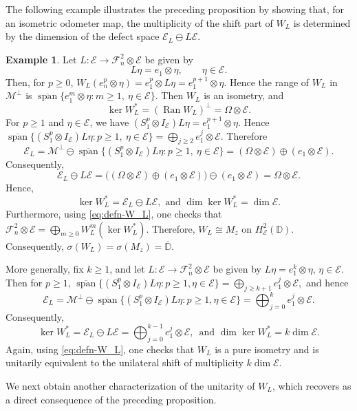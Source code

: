 \documentclass[12pt]{amsart}
\theoremstyle{definition}
\newtheorem{example}[theorem]{Example}
\theoremstyle{remark}
\def \D{\mathbb{D}}
\newcommand{\cle}{\mathcal{E}}
\newcommand{\clm}{\mathcal{M}}
\newcommand{\clf}{\mathcal{F}}
\newcommand{\ol}{\overline}
\numberwithin{equation}{section}
\begin{document}
The following example illustrates the preceding proposition by showing that, for an isometric odometer map, the multiplicity of the shift part of $W_L$ is determined by the dimension of the defect space $\cle_L\ominus L\cle$.


\begin{example}\label{rem:wold_and_mult}
Let
\(L:\cle\to \clf_n^2\otimes\cle\) be given by
\[
L\eta=e_1\otimes \eta,\qquad \eta\in\cle.
\]
Then, for \(p\geq 0\), $W_L(e_n^p\otimes \eta)
=
e_1^p\otimes L\eta
=
e_1^{p+1}\otimes \eta.$
Hence the range of \(W_L\) in \(\clm^\perp\) is $\overline{\operatorname{span}}
\{e_1^m\otimes \eta:m\geq 1,\ \eta\in\cle\}.$
Then \(W_L\) is an isometry, and
\[
\ker W_L^*
=
(\operatorname{Ran}W_L)^\perp
=
\Omega\otimes\cle.
\]
For \(p\geq 1\) and \(\eta\in\cle\), we have $(S_1^p\otimes I_\cle)L\eta
=
e_1^{p+1}\otimes\eta.$
Hence $\overline{\operatorname{span}}
\{(S_1^p\otimes I_\cle)L\eta:p\geq 1,\ \eta\in\cle\}
=
\bigoplus_{j\geq 2} e_1^j\otimes\cle.$
Therefore
\[
\cle_L
=
\clm^\perp
\ominus
\overline{\operatorname{span}}
\{(S_1^p\otimes I_\cle)L\eta:p\geq 1,\ \eta\in\cle\}
=
(\Omega\otimes\cle)\oplus(e_1\otimes\cle).
\]
Consequently,
\[
\cle_L\ominus L\cle
=
\big((\Omega\otimes\cle)\oplus(e_1\otimes\cle)\big)
\ominus
(e_1\otimes\cle)
=
\Omega\otimes\cle.
\]
Hence, 
\[
\ker W_L^*=\cle_L\ominus L\cle, \text{ and } \dim\ker W_L^*
=
\dim\cle.
\]
Furthermore, using \eqref{eq:defn-W_L}, one checks that $\clf_n^2\otimes\cle
=
\bigoplus_{m\geq 0} W_L^m(\ker W_L^*).$
Therefore, $W_L\cong M_z$ on $H^2_\cle(\D)$.
Consequently, $\sigma(W_L) = \sigma(M_z) = \ol{\D}.$

More generally, fix \(k\geq 1\), and let
\(L:\cle\to \clf_n^2\otimes\cle\) be given by $L\eta=e_1^k\otimes \eta,\, \eta\in\cle.$
Then for $p\geq 1$, $\overline{\operatorname{span}}
\{(S_1^p\otimes I_\cle)L\eta:p\geq 1,\eta\in\cle\}
=
\bigoplus_{j\geq k+1} e_1^j\otimes \cle,$ and hence
\[
\cle_L
=
\clm^\perp
\ominus
\overline{\operatorname{span}}
\{(S_1^p\otimes I_\cle)L\eta:p\geq 1,\eta\in\cle\}
=
\bigoplus_{j=0}^{k} e_1^j\otimes \cle.
\]
Consequently, 
$$\ker W_L^*=\cle_L\ominus L\cle=
\bigoplus_{j=0}^{k-1} e_1^j\otimes \cle,\, \text{ and } \dim\ker W_L^*
=
k\dim\cle.$$  
Again, using \eqref{eq:defn-W_L}, one checks that \(W_L\) is a pure isometry
and is unitarily equivalent to the unilateral shift of multiplicity
\(k\dim\cle\).
\end{example}

We next obtain another characterization of the unitarity of \(W_L\), which recovers \cite[Theorem~4.4]{mansi2025} as a direct consequence of the preceding proposition.
\end{document}
